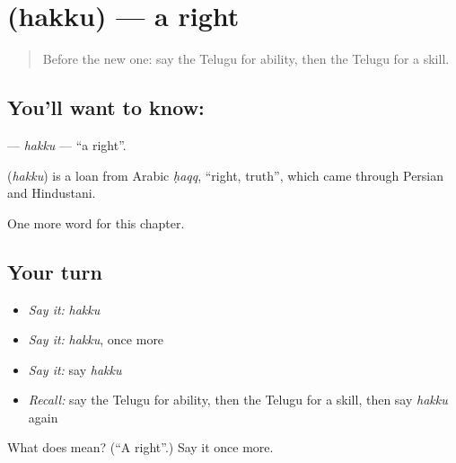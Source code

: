 \section[\texorpdfstring{\te{హక్కు} (hakku)}{హక్కు (hakku)}]{ (hakku) — a right}

\label{lesson:TE-C105-hakku}



\begin{quote}
Before the new one: say the Telugu for ability, then the Telugu for a skill.
\end{quote}

\subsection*{You'll want to know: }
\textbf{} — \emph{hakku} — \textquotedblleft{}a right\textquotedblright{}.

\begin{cousinweb}
\textbf{} (\emph{hakku}) is a loan from Arabic \emph{ḥaqq}, \textquotedblleft{}right, truth\textquotedblright{}, which came through Persian and Hindustani.
\end{cousinweb}

\begin{grammarlens}[title={What you've built}]
One more word for this chapter.
\end{grammarlens}

\subsection*{Your turn}
\begin{itemize}
\raggedright
  \item \emph{Say it:} \emph{hakku}
  \item \emph{Say it:} \emph{hakku}, once more
  \item \emph{Say it:} say \emph{hakku}
  \item \emph{Recall:} say the Telugu for ability, then the Telugu for a skill, then say \emph{hakku} again
\end{itemize}

\begin{tcolorbox}[breakable,colback=teal!4,colframe=teal!35!black,title={Before you move on}]
What does  mean? (\textquotedblleft{}A right\textquotedblright{}.) Say it once more.
\end{tcolorbox}
